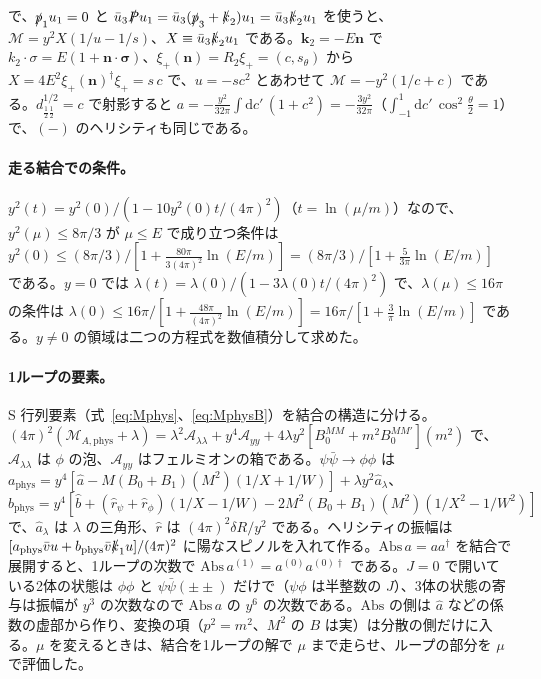 \documentclass[a4paper,10pt]{ltjsarticle}
\newcommand{\dd}{\mathrm{d}}
\begin{document}
で、$\slashed p_1u_1=0$ と $\bar u_3\slashed Pu_1=\bar u_3(\slashed p_3+\slashed k_2)u_1=\bar u_3\slashed k_2u_1$ を使うと、$\mathcal M=y^2X(1/u-1/s)$、$X\equiv\bar u_3\slashed k_2u_1$ である。$\boldsymbol k_2=-E\boldsymbol n$ で $k_2\cdot\sigma=E(1+\boldsymbol n\cdot\boldsymbol\sigma)$、$\xi_+(\boldsymbol n)=R_2\xi_+=(c,s_\theta)$ から $X=4E^2\xi_+(\boldsymbol n)^\dagger\xi_+=s\,c$ で、$u=-sc^2$ とあわせて $\mathcal M=-y^2(1/c+c)$ である。$d^{1/2}_{\frac12\frac12}=c$ で射影すると $a=-\frac{y^2}{32\pi}\int\dd c'\,(1+c^2)=-\frac{3y^2}{32\pi}$（$\int_{-1}^1\dd c'\,\cos^2\frac\theta2=1$）で、$(-)$ のヘリシティも同じである。

\paragraph{走る結合での条件。}$y^2(t)=y^2(0)/(1-10y^2(0)t/(4\pi)^2)$（$t=\ln(\mu/m)$）なので、$y^2(\mu)\le8\pi/3$ が $\mu\le E$ で成り立つ条件は $y^2(0)\le(8\pi/3)/[1+\frac{80\pi}{3(4\pi)^2}\ln(E/m)]=(8\pi/3)/[1+\frac{5}{3\pi}\ln(E/m)]$ である。$y=0$ では $\lambda(t)=\lambda(0)/(1-3\lambda(0)t/(4\pi)^2)$ で、$\lambda(\mu)\le16\pi$ の条件は $\lambda(0)\le16\pi/[1+\frac{48\pi}{(4\pi)^2}\ln(E/m)]=16\pi/[1+\frac3\pi\ln(E/m)]$ である。$y\ne0$ の領域は二つの方程式を数値積分して求めた。

\paragraph{1ループの要素。}S 行列要素（式~\eqref{eq:Mphys}、\eqref{eq:MphysB}）を結合の構造に分ける。$(4\pi)^2(\mathcal M_{A,\mathrm{phys}}+\lambda)=\lambda^2\mathcal A_{\lambda\lambda}+y^4\mathcal A_{yy}+4\lambda y^2[B_0^{MM}+m^2B_0^{MM\prime}](m^2)$ で、$\mathcal A_{\lambda\lambda}$ は $\phi$ の泡、$\mathcal A_{yy}$ はフェルミオンの箱である。$\psi\bar\psi\to\phi\phi$ は $a_{\mathrm{phys}}=y^4[\hat a-M(B_0+B_1)(M^2)(1/X+1/W)]+\lambda y^2\hat a_\lambda$、$b_{\mathrm{phys}}=y^4[\hat b+(\hat r_\psi+\hat r_\phi)(1/X-1/W)-2M^2(B_0+B_1)(M^2)(1/X^2-1/W^2)]$ で、$\hat a_\lambda$ は $\lambda$ の三角形、$\hat r$ は $(4\pi)^2\delta R/y^2$ である。ヘリシティの振幅は $[a_{\mathrm{phys}}\bar vu+b_{\mathrm{phys}}\bar v\slashed k_1u]/(4\pi)^2$ に陽なスピノルを入れて作る。$\mathrm{Abs}\,a=aa^\dagger$ を結合で展開すると、1ループの次数で $\mathrm{Abs}\,a^{(1)}=a^{(0)}a^{(0)\dagger}$ である。$J=0$ で開いている2体の状態は $\phi\phi$ と $\psi\bar\psi(\pm\pm)$ だけで（$\psi\phi$ は半整数の $J$）、3体の状態の寄与は振幅が $y^3$ の次数なので $\mathrm{Abs}\,a$ の $y^6$ の次数である。$\mathrm{Abs}$ の側は $\hat a$ などの係数の虚部から作り、変換の項（$p^2=m^2$、$M^2$ の $B$ は実）は分散の側だけに入る。$\mu$ を変えるときは、結合を1ループの解で $\mu$ まで走らせ、ループの部分を $\mu$ で評価した。
\end{document}
